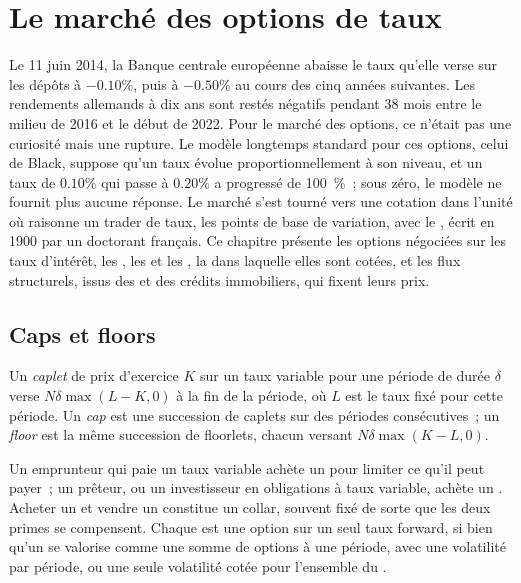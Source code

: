 \chapter{Le marché des options de taux}\label{ch:m2:the-rates-options-market}

Le 11 juin 2014, la Banque centrale européenne abaisse le taux qu'elle verse sur les dépôts
à $-0.10\%$, puis à $-0.50\%$ au cours des cinq années suivantes. Les rendements allemands à dix ans
sont restés négatifs pendant 38 mois entre le milieu de 2016 et le début de 2022. Pour le marché
des options, ce n'était pas une curiosité mais une rupture. Le modèle longtemps standard pour
ces options, celui de Black, suppose qu'un
taux évolue proportionnellement à son niveau, et un taux de $0.10\%$ qui passe à
$0.20\%$ a progressé de 100~\%~; sous zéro, le modèle ne fournit plus aucune réponse. Le marché
s'est tourné vers une cotation dans l'unité où raisonne un trader de taux, les points
de base de variation, avec le , écrit en 1900 par un doctorant français.
Ce chapitre présente les options négociées sur les taux d'intérêt, les , les  et
les , la  dans laquelle elles sont cotées, et les flux
structurels, issus des  et des crédits immobiliers, qui fixent leurs prix.

\section{Caps et floors}

\begin{definition}\label{def:m2:the-rates-options-market:cap}
Un \emph{caplet} de prix d'exercice $K$ sur un taux variable pour une période de
durée $\delta$ verse $N\delta\max(L - K, 0)$ à la fin de la période, où $L$
est le taux fixé pour cette période. Un \emph{cap} est une succession de
caplets sur des périodes consécutives~; un \emph{floor} est la même succession de
floorlets, chacun versant $N\delta\max(K - L, 0)$.
\end{definition}

Un emprunteur qui paie un taux variable achète un  pour limiter ce qu'il peut payer~; un
prêteur, ou un investisseur en obligations à taux variable, achète un . Acheter un  et
vendre un  constitue un collar, souvent fixé de sorte que les deux primes se compensent. Chaque
 est une option sur un seul taux forward, si bien qu'un  se valorise comme une somme de
options à une période, avec une volatilité par période, ou une seule volatilité
cotée pour l'ensemble du .

